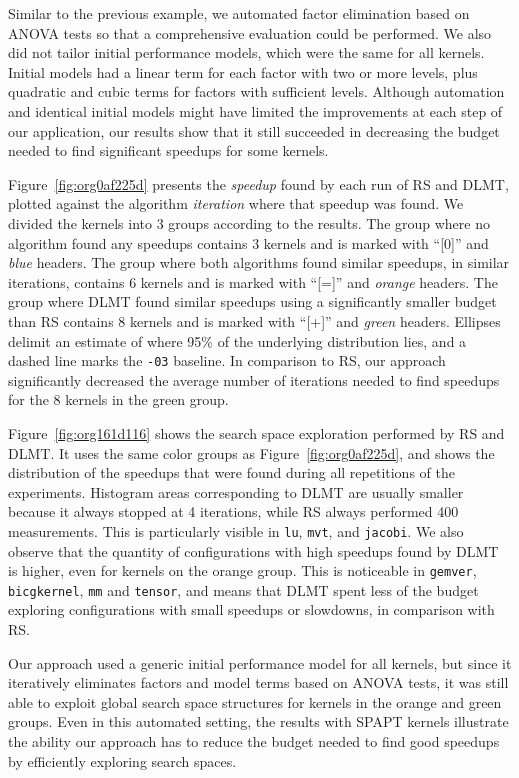 \documentclass[conference]{IEEEtran}
\begin{document}
Similar to the previous example, we automated factor elimination based on ANOVA
tests so that a comprehensive evaluation could be performed. We also did not
tailor initial performance models, which were the same for all kernels. Initial
models had a linear term for each factor with two or more levels, plus quadratic
and cubic terms for factors with sufficient levels. Although automation and
identical initial models might have limited the improvements at each step of our
application, our results show that it still succeeded in decreasing the budget
needed to find significant speedups for some kernels.

Figure~\ref{fig:org0af225d} presents the \emph{speedup} found by each
run of RS and DLMT, plotted against the algorithm \emph{iteration} where that speedup
was found. We divided the kernels into 3 groups according to the results. The
group where no algorithm found any speedups contains 3 kernels and is marked
with ``[0]'' and \emph{blue} headers. The group where both algorithms found similar
speedups, in similar iterations, contains 6 kernels and is marked with ``[=]''
and \emph{orange} headers. The group where DLMT found similar speedups using a
significantly smaller budget than RS contains 8 kernels and is marked with
``[+]'' and \emph{green} headers. Ellipses delimit an estimate of where 95\% of the
underlying distribution lies, and a dashed line marks the \texttt{-03} baseline.
In comparison to RS, our approach significantly decreased the average number of
iterations needed to find speedups for the 8 kernels in the green group.

Figure~\ref{fig:org161d116} shows the search space exploration performed
by RS and DLMT. It uses the same color groups as
Figure~\ref{fig:org0af225d}, and shows the distribution of the
speedups that were found during all repetitions of the experiments. Histogram
areas corresponding to DLMT are usually smaller because it always stopped at 4
iterations, while RS always performed 400 measurements. This is particularly
visible in \texttt{lu}, \texttt{mvt}, and \texttt{jacobi}. We also observe that the quantity of
configurations with high speedups found by DLMT is higher, even for kernels on
the orange group. This is noticeable in \texttt{gemver}, \texttt{bicgkernel}, \texttt{mm} and
\texttt{tensor}, and means that DLMT spent less of the budget exploring
configurations with small speedups or slowdowns, in comparison with RS.

Our approach used a generic initial performance model for all kernels, but
since it iteratively eliminates factors and model terms based on ANOVA tests,
it was still able to exploit global search space structures for kernels in the orange
and green groups. Even in this automated setting, the results with SPAPT kernels
illustrate the ability our approach has to reduce the budget needed to find good
speedups by efficiently exploring search spaces.
\end{document}
